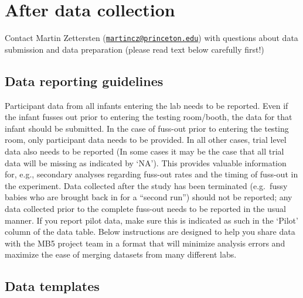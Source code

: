 \documentclass[
]{book}
\begin{document}
\chapter{After data collection}\label{after-data-collection}

Contact Martin Zettersten (\href{mailto:martincz@princeton.edu}{\nolinkurl{martincz@princeton.edu}}) with questions about data submission and data preparation (please read text below carefully first!)

\section{Data reporting guidelines}\label{data-reporting-guidelines}

Participant data from all infants entering the lab needs to be reported. Even if the infant fusses out prior to entering the testing room/booth, the data for that infant should be submitted. In the case of fuss-out prior to entering the testing room, only participant data needs to be provided. In all other cases, trial level data also needs to be reported (In some cases it may be the case that all trial data will be missing as indicated by `NA'). This provides valuable information for, e.g., secondary analyses regarding fuss-out rates and the timing of fuss-out in the experiment. Data collected after the study has been terminated (e.g.~fussy babies who are brought back in for a ``second run'') should not be reported; any data collected prior to the complete fuss-out needs to be reported in the usual manner. If you report pilot data, make sure this is indicated as such in the `Pilot' column of the data table.
Below instructions are designed to help you share data with the MB5 project team in a format that will minimize analysis errors and maximize the ease of merging datasets from many different labs.

\section{Data templates}\label{data-templates}
\end{document}
